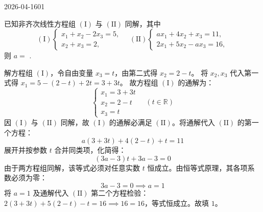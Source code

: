 \begin{mistake}{2026-04-16}{01}

\begin{problemcontent}
已知非齐次线性方程组 \((\mathrm{I})\) 与 \((\mathrm{II})\) 同解，其中
\[
(\mathrm{I}) \begin{cases} x_1 + x_2 - 2x_3 = 5, \\ x_2 + x_3 = 2, \end{cases} \quad
(\mathrm{II}) \begin{cases} ax_1 + 4x_2 + x_3 = 11, \\ 2x_1 + 5x_2 - ax_3 = 16, \end{cases}
\]
则 \(a =\) \underline{\hspace{2cm}}.
\end{problemcontent}

\begin{solutioncontent}
解方程组 \((\mathrm{I})\)，令自由变量 \(x_3 = t\)，由第二式得 \(x_2 = 2 - t\)。
将 \(x_2, x_3\) 代入第一式得 \(x_1 = 5 - (2 - t) + 2t = 3 + 3t\)。
故方程组 \((\mathrm{I})\) 的通解为：
\[
\begin{cases}
x_1 = 3 + 3t \\
x_2 = 2 - t \\
x_3 = t
\end{cases} \quad (t \in \mathbb{R})
\]
因 \((\mathrm{I})\) 与 \((\mathrm{II})\) 同解，故 \((\mathrm{I})\) 的通解必满足 \((\mathrm{II})\)。将通解代入 \((\mathrm{II})\) 的第一个方程：
\[
a(3 + 3t) + 4(2 - t) + t = 11
\]
展开并按参数 \(t\) 合并同类项，化简得：
\[
(3a - 3)t + 3a - 3 = 0
\]
由于两方程组同解，该等式必须对任意实数 \(t\) 恒成立。由恒等式原理，其各项系数必须为零：
\[
3a - 3 = 0 \implies a = 1
\]
将 \(a=1\) 及通解代入 \((\mathrm{II})\) 第二个方程检验：\(2(3+3t)+5(2-t)-t=16 \implies 16=16\)，等式恒成立。故填 \(1\)。
\end{solutioncontent}


\end{mistake}
